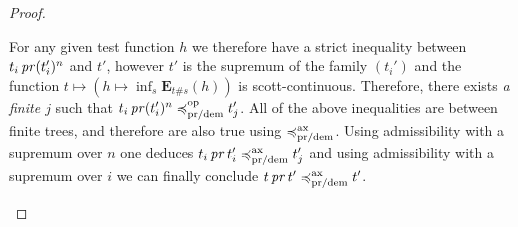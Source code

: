 \begin{proof}
\begin{description}
    For any given test function $h$ we therefore have a strict 
    inequality between $t_i \operatorname{\mathit{pr}} (t_i')^n$ and $t'$, however 
    $t'$ is the supremum of the family $(t_i')$ and the function 
    $ t \mapsto (h \mapsto \inf_s \mathbf{E}_{ t \# s} (h))$ is scott-continuous.
    Therefore, there exists \emph{a finite $j$} such that 
    $t_i \operatorname{\mathit{pr}} (t_i')^n \preccurlyeq^{\text{op}}_{\text{pr/dem}} t_j'$.
    All of the above inequalities are between finite trees, and 
    therefore are also true using $\preccurlyeq^{\text{ax}}_{\text{pr/dem}}$.
    Using admissibility with a supremum over $n$ 
    one deduces $t_i \operatorname{\mathit{pr}} t_i' \preccurlyeq^{\text{ax}}_{\text{pr/dem}} t_j'$
    and using admissibility with a supremum over $i$ we can finally conclude
    $t \operatorname{\mathit{pr}} t' \preccurlyeq^{\text{ax}}_{\text{pr/dem}} t'$.
    \end{description}
    

\end{proof}

